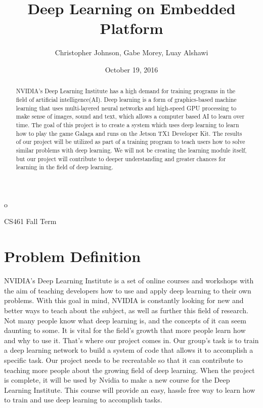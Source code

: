 o\documentclass[letterpaper,10pt]{article}
\author{Christopher Johnson, Gabe Morey, Luay Alshawi}
\title{Deep Learning on Embedded Platform}
\date{October 19, 2016}
\begin{document}
\begin{titlingpage}
\maketitle
CS461 Fall Term
\begin{abstract}
NVIDIA's Deep Learning Institute has a high demand for training programs in the field of artificial intelligence(AI).
Deep learning is a form of graphics-based machine learning that uses multi-layered neural networks and high-speed GPU processing to make sense of images, sound and text, which allows a computer based AI to learn over time.
The goal of this project is to create a system which uses deep learning to learn how to play the game Galaga and runs on the Jetson TX1 Developer Kit.
The results of our project will be utilized as part of a training program to teach users how to solve similar problems with deep learning.
We will not be creating the learning module itself, but our project will contribute to deeper understanding and greater chances for learning in the field of deep learning.
\end{abstract}
\end{titlingpage}

\section{Problem Definition}
NVIDIA’s Deep Learning Institute is a set of online courses and workshops with the aim of teaching developers how to use and apply deep learning to their own problems.
With this goal in mind, NVIDIA is constantly looking for new and better ways to teach about the subject, as well as further this field of research.
Not many people know what deep learning is, and the concepts of it can seem daunting to some.
It is vital for the field's growth that more people learn how and why to use it.
That's where our project comes in.
Our group’s task is to train a deep learning network to build a system of code that allows it to accomplish a specific task.
Our project needs to be recreatable so that it can contribute to teaching more people about the growing field of deep learning.
When the project is complete, it will be used by Nvidia to make a new course for the Deep Learning Institute.
This course will provide an easy, hassle free way to learn how to train and use deep learning to accomplish tasks.
\end{document}
